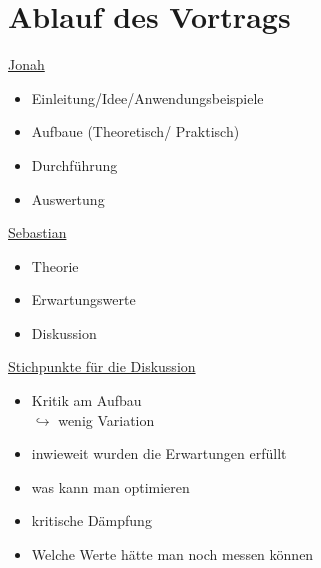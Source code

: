 



\section{Ablauf des Vortrags}

\underline{Jonah}

\begin{itemize}
  \item Einleitung/Idee/Anwendungsbeispiele
  \item Aufbaue (Theoretisch/ Praktisch)
  \item Durchführung
  \item Auswertung
\end{itemize}

\underline{Sebastian}

\begin{itemize}
  \item Theorie
  \item Erwartungswerte
  \item Diskussion
\end{itemize}

\underline{Stichpunkte für die Diskussion}

\begin{itemize}
  \item Kritik am Aufbau \\ $\hookrightarrow$ wenig Variation
  \item inwieweit wurden die Erwartungen erfüllt
  \item was kann man optimieren
  \item kritische Dämpfung
  \item Welche Werte hätte man noch messen können
\end{itemize}



